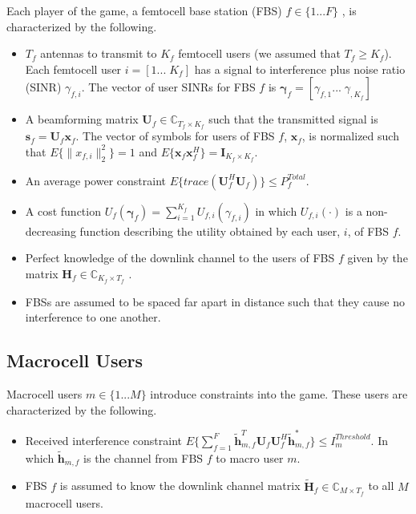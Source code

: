 Each player of the game, a femtocell base station (FBS) $f \in \{1 ... F\}$ , is characterized by the following.
\begin{itemize}
\item 
$T_{f}$ antennas to transmit to $K_{f}$ femtocell users (we assumed that $T_{f} \geq K_{f}$). Each femtocell user $i = [1... \;K_{f}]$ has a signal to interference plus noise ratio (SINR) $\gamma_{f,i}$. The vector of user SINRs for FBS $f$ is $\boldsymbol{\gamma}_{f} = [\gamma_{f,1}...\; \gamma_{,K_{f}}]$
\\
\item 
	A beamforming matrix $\mathbf{U}_{f} \in \mathbb{C}_{T_{f} \times K_{f}}$ such that the transmitted 		
	signal is $\mathbf{s}_{f
	}= \mathbf{U}_{f}\mathbf{x}_{f}$. The 		
	vector of symbols for users of FBS $f$, $\mathbf{x}_{f}$, is  normalized such that $E\{\|x_{f,i}
	\|_2^2\}=1$ and $E\{\mathbf{x}_{f}\mathbf{x}_{f}^H\}=\mathbf{I}_{K_{f} \times K_{f}}$.
\\
\item 
	An average power constraint $E\{trace(\mathbf{U}_{f}^H\mathbf{U}_{f})\} \leq P^{Total}_{f} $.

\item 
	A cost function $U_{f}(\boldsymbol{\gamma}_{f}) =
	\sum_{i=1}^{K_{f}}
    	 U_{f,i}(\gamma_{f,i}) $
    	in which $U_{f,i}(\cdot)$ is a non-decreasing function describing the utility obtained by each user, $i$, of FBS $f$.

\item 
	Perfect knowledge of the downlink channel to the users of FBS $f$ given by the matrix $\mathbf{H}_f \in \mathbb{C}_{K_{f} \times T_{f}} $ .
\\
\item
	 FBSs are assumed to be spaced far apart in distance such that they cause no interference to one another.
\end{itemize}

\subsection{Macrocell Users}
Macrocell users $m \in \{1 ... M\}$ introduce constraints into the game. These users are characterized by the following.

\begin{itemize}
\item 
	Received interference constraint
	$E\{\sum^F_{f=1} \tilde{\mathbf{h}}_{m,f}^T  \mathbf{U}_{f}					
	\mathbf{U}_{f}^{H} \tilde{\mathbf{h}}_{m,f}^*\} \leq I^{Threshold}		
	_{m} $. In which $\tilde{\mathbf{h}}_{m,f}$ is the channel from FBS $f$ to macro user $m$.

\item 
	FBS $f$ is assumed to know the downlink channel matrix $\tilde{\mathbf{H}}_{f} \in \mathbb{C}_{M \times T_{f}}$ to all $M$ macrocell users.
\\
\end{itemize}

